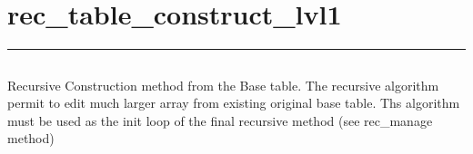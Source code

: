 \documentclass[letterpaper,10pt,english]{sphinxmanual}
\begin{document}
\begin{sphinxVerbatim}[commandchars=\\\{\}]
 
\end{sphinxVerbatim}

\newpage
\section{rec\_table\_construct\_lvl1}
\label{\detokenize{rec_table_construct_lvl1v2:rec-table-construct-lvl1}}\label{\detokenize{rec_table_construct_lvl1v2::doc}}
\begin{sphinxVerbatim}[commandchars=\\\{\}]
 
\end{sphinxVerbatim}


\bigskip\hrule\bigskip



\subsection{}
\label{\detokenize{rec_table_construct_lvl1v2:algorithm}}
\sphinxAtStartPar
Recursive Construction method from the Base table.
The recursive algorithm permit to edit much larger array from existing original base table.
Ths algorithm must be used as the init loop of the final recursive method (see rec\_manage method)
\end{document}
